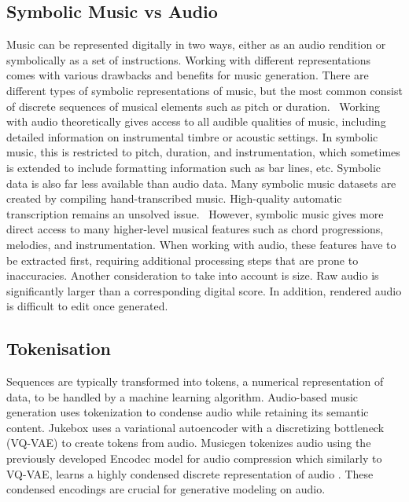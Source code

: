 \subsection{Symbolic Music vs Audio}\label{section:symbolic_audio}
Music can be represented digitally in two ways, either as an audio rendition or symbolically as a set of instructions. Working with different representations comes with various drawbacks and benefits for music generation. There are different types of symbolic representations of music, but the most common consist of discrete sequences of musical elements such as pitch or duration.  Working with audio theoretically gives access to all audible qualities of music, including detailed information on instrumental timbre or acoustic settings. In symbolic music, this is restricted to pitch, duration, and instrumentation, which sometimes is extended to include formatting information such as bar lines, etc. 
Symbolic data is also far less available than audio data. Many symbolic music datasets are created by compiling hand-transcribed music. High-quality automatic transcription remains an unsolved issue.\cite{Ji_Yang_Luo_survey_symbolic_2024}\cite{Chen_Smith_Spijkervet_Wang_Zou_Li_Kong_Du_2024}  However, symbolic music gives more direct access to many higher-level musical features such as chord progressions, melodies, and instrumentation. When working with audio, these features have to be extracted first, requiring additional processing steps that are prone to inaccuracies. 
Another consideration to take into account is size. Raw audio is significantly larger than a corresponding digital score. In addition, rendered audio is difficult to edit once generated. 

\subsection{Tokenisation}\label{section:tokenization}
Sequences are typically transformed into tokens, a numerical representation of data, to be handled by a machine learning algorithm. Audio-based music generation uses tokenization to condense audio while retaining its semantic content. Jukebox \cite{Dhariwal_Jun_Payne_Kim_Radford_Sutskever_2020} uses a variational autoencoder\cite{Kingma_Welling_2014} with a discretizing bottleneck (VQ-VAE) to create tokens from audio. Musicgen \cite{copet2023simple} tokenizes audio using the previously developed Encodec model for audio compression which similarly to VQ-VAE, learns a highly condensed discrete representation of audio \cite{Défossez_2023_encodec}. These condensed encodings are crucial for generative modeling on audio.


